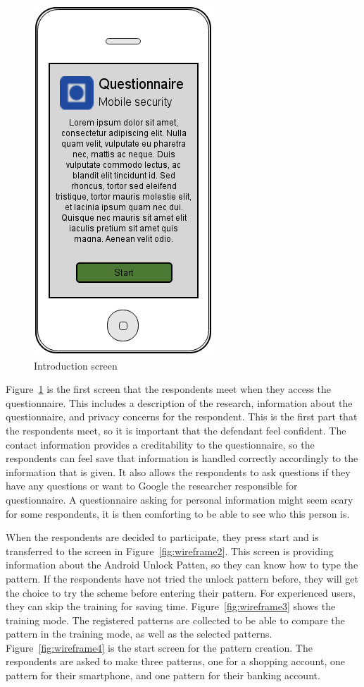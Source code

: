     \begin{figure}
      \centering
      \vspace{-5pt}
      \includegraphics[scale=0.40]{screens/v3/mobile/mobile1-1.png}
      \caption{Introduction screen}
      \label{fig:wireframe1}
    \end{figure}

  Figure~\ref{fig:wireframe1} is the first screen that the respondents meet when they access the questionnaire. This includes a description of the research, information about the questionnaire, and privacy concerns for the respondent. This is the first part that the respondents meet, so it is important that the defendant feel confident. The contact information provides a creditability to the questionnaire, so the respondents can feel save that information is handled correctly accordingly to the information that is given. It also allows the respondents to ask questions if they have any questions or want to Google the researcher responsible for questionnaire. A questionnaire asking for personal information might seem scary for some respondents, it is then comforting to be able to see who this person is.

  When the respondents are decided to participate, they press start and is transferred to the screen in Figure~\ref{fig:wireframe2}. This screen is providing information about the Android Unlock Patten, so they can know how to type the pattern. If the respondents have not tried the unlock pattern before, they will get the choice to try the scheme before entering their pattern. For experienced users, they can skip the training for saving time. Figure~\ref{fig:wireframe3} shows the training mode. The registered patterns are collected to be able to compare the pattern in the training mode, as well as the selected patterns. Figure~\ref{fig:wireframe4} is the start screen for the pattern creation. The respondents are asked to make three patterns, one for a shopping account, one pattern for their smartphone, and one pattern for their banking account.

